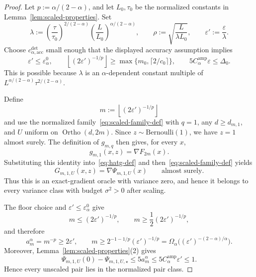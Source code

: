 \documentclass[11pt]{article}
\newcommand{\Ortho}{\operatorname{Ortho}}
\begin{document}
\begin{proof}
Let $p:=\alpha/(2-\alpha)$, and let $L_0,\tau_0$ be the normalized constants in
Lemma~\ref{lem:scaled-properties}. Set
\[
\lambda:=
\left(\frac{\tau}{\tau_0}\right)^{2/(2-\alpha)}
\left(\frac{L}{L_0}\right)^{\alpha/(2-\alpha)},
\qquad
\rho:=\sqrt{\frac{L}{\lambda L_0}},
\qquad
\varepsilon':=\frac{\varepsilon}{\lambda}.
\]
Choose $c_{\alpha,\mathrm{acc}}^{\mathrm{det}}$ small enough that the displayed accuracy assumption implies
\[
\varepsilon'\le\varepsilon_\alpha^0,
\qquad
\left\lfloor(2\varepsilon')^{-1/p}\right\rfloor\ge
\max\{m_0,\lceil2/c_0\rceil\},
\qquad
5C_\alpha^{\mathrm{amp}}\varepsilon\le\Delta_0.
\]
This is possible because $\lambda$ is an $\alpha$-dependent constant multiple of
$L^{\alpha/(2-\alpha)}\tau^{2/(2-\alpha)}$.

Define
\[
m:=\left\lfloor(2\varepsilon')^{-1/p}\right\rfloor
\]
and use the normalized family~\eqref{eq:scaled-family-def} with $q=1$, any $d\ge d_{m,1}$, and
$U$ uniform on $\Ortho(d,2m)$. Since $z\sim\mathrm{Bernoulli}(1)$, we have $z=1$ almost surely. The definition of
$g_{m,q}$ then gives, for every $x$,
\[
g_{m,1}(x,z)=\nabla F_{2m}(x).
\]
Substituting this identity into~\eqref{eq:hatg-def} and then~\eqref{eq:scaled-family-def} yields
\[
G_{m,1,U}(x,z)=\nabla\Psi_{m,1,U}(x)
\qquad\text{almost surely}.
\]
Thus this is an exact-gradient oracle with variance zero, and hence it belongs to every variance class with budget
$\sigma^2>0$ after scaling.

The floor choice and $\varepsilon'\le\varepsilon_\alpha^0$ give
\[
m\le(2\varepsilon')^{-1/p},
\qquad
m\ge\frac12(2\varepsilon')^{-1/p},
\]
and therefore
\begin{equation}
\label{eq:q-one-amplitude-bounds}
a_m^\alpha=m^{-p}\ge2\varepsilon',
\qquad
m\ge2^{-1-1/p}(\varepsilon')^{-1/p}
=\Omega_\alpha\bigl((\varepsilon')^{-(2-\alpha)/\alpha}\bigr).
\end{equation}
Moreover, Lemma~\ref{lem:scaled-properties}(2) gives
\[
\Psi_{m,1,U}(0)-\Psi_{m,1,U,\star}
\le5a_m^\alpha
\le5C_\alpha^{\mathrm{amp}}\varepsilon'\le1.
\]
Hence every unscaled pair lies in the normalized pair class.


\end{proof}
\end{document}
